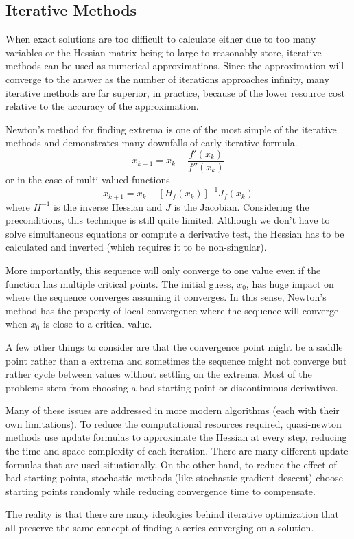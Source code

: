 \documentclass[10pt,a4paper]{report}
\begin{document}
			\subsection{Iterative Methods}
					When exact solutions are too difficult to calculate either due to too many variables or the Hessian matrix being to large
					to reasonably store, iterative methods can be used as numerical approximations. Since the approximation will converge to the
					answer as the number of iterations approaches infinity, many iterative methods are far superior, in practice, because of the lower
					resource cost relative to the accuracy of the approximation. \par
					Newton's method for finding extrema \autocite{fletcher2013practical} is one of the most simple of the iterative methods
					and demonstrates many downfalls of early iterative formula.
					\begin{equation}
						x_{k+1} = x_k - \frac{f'(x_k)}{f''(x_k)}
						\label{eq:newtons-method-single}
					\end{equation}
					or in the case of multi-valued functions
					\begin{equation}
						x_{k+1} = x_k - [H_f(x_k)]^{-1} J_f(x_k)
						\label{eq:newtons-method-multi}
					\end{equation}
					where $H^{-1}$ is the inverse Hessian and $J$ is the Jacobian. Considering the preconditions, this technique is still quite limited.
					Although we don't have to solve simultaneous equations or compute a derivative test, the Hessian has to be calculated and inverted (which requires it to be non-singular). \par
					More importantly, this sequence will only converge to one value even if the function has multiple critical points. The initial guess, $x_0$,
					has huge impact on where the sequence converges assuming it converges. In this sense, Newton's method has the
					property of local convergence where the sequence will converge when $x_0$ is close to a critical value. \par
					A few other things to consider are that the convergence point might be a saddle point rather than a extrema and sometimes the sequence might
					not converge but rather cycle between values without settling on the extrema. Most of the problems stem from choosing a bad starting point or
					discontinuous derivatives. \par
					Many of these issues are addressed in more modern algorithms (each with their own limitations).
					To reduce the computational resources required, quasi-newton methods use update formulas to approximate the Hessian at every step, reducing the time and space complexity of each iteration.
					There are many different update formulas that are used situationally. On the other hand, to reduce the effect of bad starting points, stochastic methods (like stochastic gradient descent)
					choose starting points randomly while reducing convergence time to compensate. \par
					The reality is that there are many ideologies behind iterative optimization that
					all preserve the same concept of finding a series converging on a solution.

\listoffigures
\printbibliography[title=References]
\end{document}
